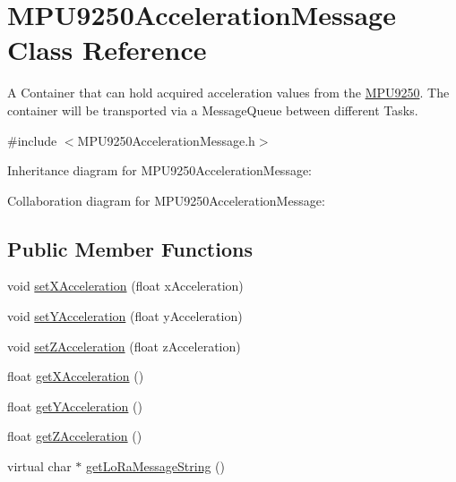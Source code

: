 \hypertarget{class_m_p_u9250_acceleration_message}{}\section{M\+P\+U9250\+Acceleration\+Message Class Reference}
\label{class_m_p_u9250_acceleration_message}


A Container that can hold acquired acceleration values from the \hyperlink{class_m_p_u9250}{M\+P\+U9250}. The container will be transported via a Message\+Queue between different Tasks.  




{\ttfamily \#include $<$M\+P\+U9250\+Acceleration\+Message.\+h$>$}



Inheritance diagram for M\+P\+U9250\+Acceleration\+Message\+:


Collaboration diagram for M\+P\+U9250\+Acceleration\+Message\+:
\subsection*{Public Member Functions}
\begin{DoxyCompactItemize}
\item 
void \hyperlink{class_m_p_u9250_acceleration_message_a7d47004b639f7e9aa99dac5230c66f86}{set\+X\+Acceleration} (float x\+Acceleration)
\item 
void \hyperlink{class_m_p_u9250_acceleration_message_a81b5d3e5f3be6481295cd5fe6f834242}{set\+Y\+Acceleration} (float y\+Acceleration)
\item 
void \hyperlink{class_m_p_u9250_acceleration_message_a45c3a9e1db213302d5627389beb8c7bd}{set\+Z\+Acceleration} (float z\+Acceleration)
\item 
float \hyperlink{class_m_p_u9250_acceleration_message_aace29ce8da4dbb851ea1b05445e4e11f}{get\+X\+Acceleration} ()
\item 
float \hyperlink{class_m_p_u9250_acceleration_message_adfdd339c1a952fe1802d22b61886605f}{get\+Y\+Acceleration} ()
\item 
float \hyperlink{class_m_p_u9250_acceleration_message_a6dc58a0e34ed0c57971becebf0695663}{get\+Z\+Acceleration} ()
\item 
virtual char $\ast$ \hyperlink{class_m_p_u9250_acceleration_message_a76afe97e9852bfea5b29b6b9a41647aa}{get\+Lo\+Ra\+Message\+String} ()
\end{DoxyCompactItemize}



